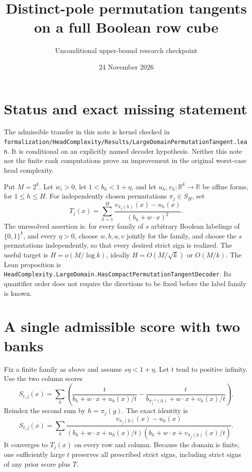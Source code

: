 \documentclass[11pt]{article}
\title{Distinct-pole permutation tangents on a full Boolean row cube}
\author{Unconditional upper-bound research checkpoint}
\date{24 November 2026}
\newcommand{\R}{\mathbb R}
\newcommand{\cube}{\{0,1\}^k}
\begin{document}
\maketitle

\section{Status and exact missing statement}
The admissible transfer in this note is kernel checked in
\texttt{formalization/HeadComplexity/Results/LargeDomainPermutationTangent.lean}.
It is conditional on an explicitly named decoder hypothesis. Neither this
note nor the finite rank computations prove an improvement in the original
worst-case head complexity.

Put $M=2^k$. Let $w_i>0$, let $1<b_h<1+\eta$, and let
$u_h,v_h:\R^k\to\R$ be affine forms, for $1\leq h\leq H$.
For independently chosen permutations $\pi_j\in S_H$, set
\[
 T_j(x)=\sum_{h=1}^H
 \frac{v_{\pi_j(h)}(x)-u_h(x)}{(b_h+w\cdot x)^2}.
\]
The unresolved assertion is: for every family of $s$ arbitrary Boolean
labelings of $\cube$, and every $\eta>0$, choose $w,b,u,v$ jointly for the
family, and choose the $s$ permutations independently, so that every desired
strict sign is realized. The useful target is
$H=o(M/\log k)$, ideally $H=O(M/\sqrt{k})$ or $O(M/k)$.
The Lean proposition is
\texttt{HeadComplexity.LargeDomain.HasCompactPermutationTangentDecoder}.
Its quantifier order does not require the directions to be fixed before the
label family is known.

\section{A single admissible score with two banks}
Fix a finite family as above and assume $s\eta<1+\eta$. Let $t$ tend to
positive infinity. Use the two column scores
\[
 S_{t,j}(x)=\sum_h\left(
 \frac{t}{b_h+w\cdot x+u_h(x)/t}
 -\frac{t}{b_{\pi_j^{-1}(h)}+w\cdot x+v_h(x)/t}
 \right).
\]
Reindex the second sum by $h=\pi_j(g)$. The exact identity is
\[
 S_{t,j}(x)=\sum_h
 \frac{v_{\pi_j(h)}(x)-u_h(x)}
 {(b_h+w\cdot x+u_h(x)/t)
  (b_h+w\cdot x+v_{\pi_j(h)}(x)/t)}.
\]
It converges to $T_j(x)$ on every row and column. Because the domain is
finite, one sufficiently large $t$ preserves all prescribed strict signs,
including strict signs of any prior score plus $T$.
\end{document}
